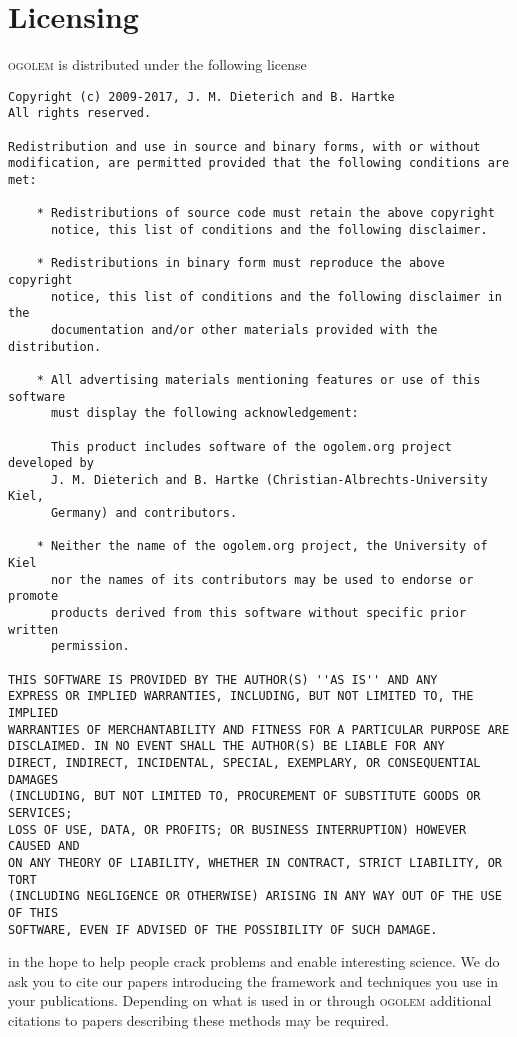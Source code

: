\documentclass[a4paper,10pt]{scrbook}
\newcommand{\ogo}{\textsc{ogolem}}
\begin{document}
\section{Licensing}
\ogo{} is distributed under the following license
\begin{verbatim}
Copyright (c) 2009-2017, J. M. Dieterich and B. Hartke
All rights reserved.

Redistribution and use in source and binary forms, with or without
modification, are permitted provided that the following conditions are met:

    * Redistributions of source code must retain the above copyright
      notice, this list of conditions and the following disclaimer.

    * Redistributions in binary form must reproduce the above copyright
      notice, this list of conditions and the following disclaimer in the
      documentation and/or other materials provided with the distribution.

    * All advertising materials mentioning features or use of this software
      must display the following acknowledgement:

      This product includes software of the ogolem.org project developed by
      J. M. Dieterich and B. Hartke (Christian-Albrechts-University Kiel,
      Germany) and contributors.

    * Neither the name of the ogolem.org project, the University of Kiel
      nor the names of its contributors may be used to endorse or promote
      products derived from this software without specific prior written
      permission.

THIS SOFTWARE IS PROVIDED BY THE AUTHOR(S) ''AS IS'' AND ANY
EXPRESS OR IMPLIED WARRANTIES, INCLUDING, BUT NOT LIMITED TO, THE IMPLIED
WARRANTIES OF MERCHANTABILITY AND FITNESS FOR A PARTICULAR PURPOSE ARE
DISCLAIMED. IN NO EVENT SHALL THE AUTHOR(S) BE LIABLE FOR ANY
DIRECT, INDIRECT, INCIDENTAL, SPECIAL, EXEMPLARY, OR CONSEQUENTIAL DAMAGES
(INCLUDING, BUT NOT LIMITED TO, PROCUREMENT OF SUBSTITUTE GOODS OR SERVICES;
LOSS OF USE, DATA, OR PROFITS; OR BUSINESS INTERRUPTION) HOWEVER CAUSED AND
ON ANY THEORY OF LIABILITY, WHETHER IN CONTRACT, STRICT LIABILITY, OR TORT
(INCLUDING NEGLIGENCE OR OTHERWISE) ARISING IN ANY WAY OUT OF THE USE OF THIS
SOFTWARE, EVEN IF ADVISED OF THE POSSIBILITY OF SUCH DAMAGE.
\end{verbatim}
in the hope to help people crack problems and enable interesting science. We do 
ask you to cite our papers
introducing the framework and techniques you use in your
publications\cite{ogolem_first,lj_reparam,ogo_switches, 
kana_dimer,benchmark,water_pccp,gdm,water_small,cage1,cage2,earth}. Depending 
on what is used in or through \ogo{} additional citations to papers describing 
these methods may be required.
\end{document}
